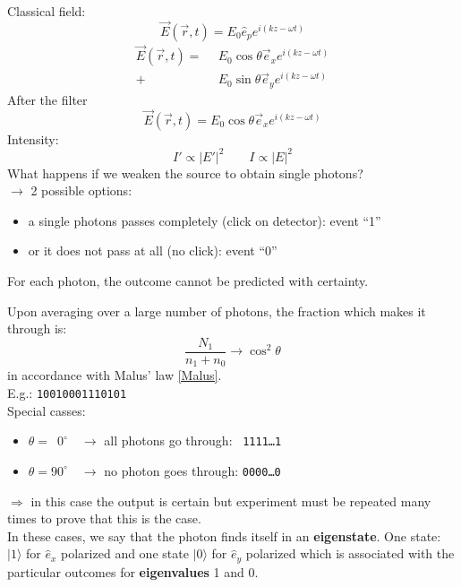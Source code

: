 \noindent
Classical field:
\begin{equation}
\vec{E}(\vec{r},t) = E_0 \hat{e}_{p} e^{i (k z - \omega t)}
\end{equation}
\begin{align*}
\vec{E}(\vec{r},t) = \ \ & E_0 \cos \theta \vec{e}_x e^{i(kz - \omega t)}\\
+ & E_0 \sin \theta \vec{e}_{y} e^{i(kz - \omega t)}
\end{align*}
After the filter
$$ \vec{E}(\vec{r},t) = E_0 \cos\theta \vec{e}_{x}e^{i(kz - \omega t)} $$
Intensity:
\begin{equation*}
I' \propto | E' |^2 \qquad I \propto | E | ^2
\end{equation*}
\noindent
What happens if we weaken the source to obtain single photons?\\
$ \rightarrow $ 2 possible options:
\begin{itemize}
	\item a single photons passes completely (click on detector): event ``1''
	\item or it does not pass at all (no click): event ``0''
\end{itemize}
For each photon, the outcome cannot be predicted with certainty.\par
Upon averaging over a large number of photons, the fraction which makes it through is:
\begin{equation*}
\frac{N_1}{n_1 + n_0} \to \cos^2 \theta
\end{equation*}
in accordance with Malus' law \eqref{Malus}.\\[10pt]
E.g.: \texttt{10010001110101}\\[5pt]
Special casses:
\begin{itemize}
	\item $ \theta = \phantom{0}0^\circ \quad \to $ all photons go through: $\phantom{1}$\texttt{1111\dots1}
	\item $ \theta = 90^\circ \quad \to $ no photon goes through: \texttt{0000\dots0}
\end{itemize}
$ \Rightarrow $ in this case the output is certain but experiment must be repeated many times to prove that this is the case.\\[10pt]
In these cases, we say that the photon finds itself in an \textbf{eigenstate}. One state: $ |1\rangle $ for $ \hat{e}_x $ polarized and one state $ |0\rangle $ for $ \hat{e}_y $ polarized which is associated with the particular outcomes for \textbf{eigenvalues} 1 and 0.\\[10pt]

